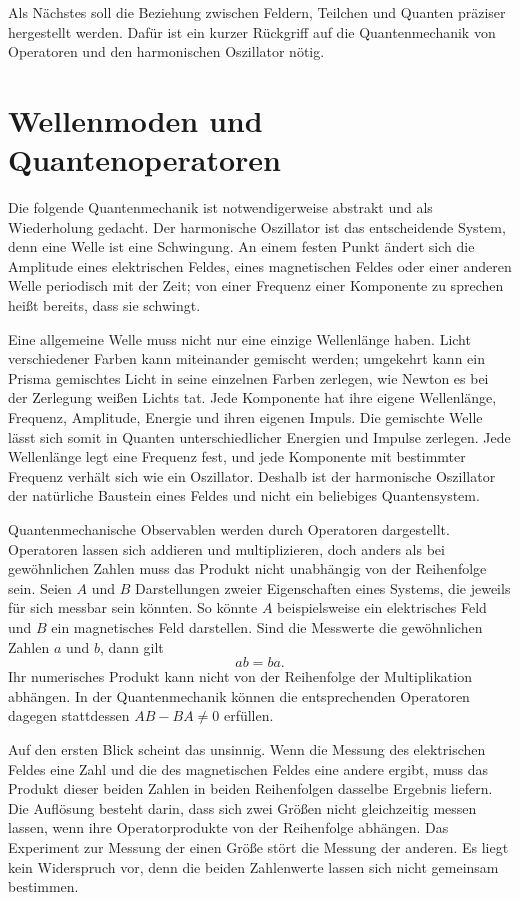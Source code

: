 Als Nächstes soll die Beziehung zwischen Feldern, Teilchen und Quanten präziser hergestellt werden. Dafür ist ein kurzer Rückgriff auf die Quantenmechanik von Operatoren und den harmonischen Oszillator nötig.

\section{Wellenmoden und Quantenoperatoren}

Die folgende Quantenmechanik ist notwendigerweise abstrakt und als Wiederholung gedacht. Der harmonische Oszillator ist das entscheidende System, denn eine Welle ist eine Schwingung. An einem festen Punkt ändert sich die Amplitude eines elektrischen Feldes, eines magnetischen Feldes oder einer anderen Welle periodisch mit der Zeit; von einer Frequenz einer Komponente zu sprechen heißt bereits, dass sie schwingt.

Eine allgemeine Welle muss nicht nur eine einzige Wellenlänge haben. Licht verschiedener Farben kann miteinander gemischt werden; umgekehrt kann ein Prisma gemischtes Licht in seine einzelnen Farben zerlegen, wie Newton es bei der Zerlegung weißen Lichts tat. Jede Komponente hat ihre eigene Wellenlänge, Frequenz, Amplitude, Energie und ihren eigenen Impuls. Die gemischte Welle lässt sich somit in Quanten unterschiedlicher Energien und Impulse zerlegen. Jede Wellenlänge legt eine Frequenz fest, und jede Komponente mit bestimmter Frequenz verhält sich wie ein Oszillator. Deshalb ist der harmonische Oszillator der natürliche Baustein eines Feldes und nicht ein beliebiges Quantensystem.

Quantenmechanische Observablen werden durch Operatoren dargestellt. Operatoren lassen sich addieren und multiplizieren, doch anders als bei gewöhnlichen Zahlen muss das Produkt nicht unabhängig von der Reihenfolge sein. Seien \(A\) und \(B\) Darstellungen zweier Eigenschaften eines Systems, die jeweils für sich messbar sein könnten. So könnte \(A\) beispielsweise ein elektrisches Feld und \(B\) ein magnetisches Feld darstellen. Sind die Messwerte die gewöhnlichen Zahlen \(a\) und \(b\), dann gilt
\begin{equation}
ab=ba.
\end{equation}
Ihr numerisches Produkt kann nicht von der Reihenfolge der Multiplikation abhängen. In der Quantenmechanik können die entsprechenden Operatoren dagegen stattdessen \(AB-BA\neq0\) erfüllen.

Auf den ersten Blick scheint das unsinnig. Wenn die Messung des elektrischen Feldes eine Zahl und die des magnetischen Feldes eine andere ergibt, muss das Produkt dieser beiden Zahlen in beiden Reihenfolgen dasselbe Ergebnis liefern. Die Auflösung besteht darin, dass sich zwei Größen nicht gleichzeitig messen lassen, wenn ihre Operatorprodukte von der Reihenfolge abhängen. Das Experiment zur Messung der einen Größe stört die Messung der anderen. Es liegt kein Widerspruch vor, denn die beiden Zahlenwerte lassen sich nicht gemeinsam bestimmen.

